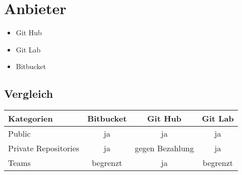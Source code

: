 \section{Anbieter}
\begin{frame}
\begin{itemize}
	\item Git Hub
	\item Git Lab
	\item Bitbucket
\end{itemize}
\end{frame}
\subsection{Vergleich}
\begin{frame}
	\begin{tabular}{l|c|c|c}
		Kategorien & Bitbucket & Git Hub & Git Lab \\\hline
		Public & ja & ja & ja\\
		Private Repositories & ja & gegen Bezahlung & ja \\
		Teams & begrenzt & ja & begrenzt\\
	\end{tabular}
\end{frame}